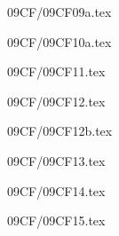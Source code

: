 \documentclass[9pt, xcolor={svgnames, x11names},professionalfonts]{beamer}
\def\scale{1}
\begin{document}

\begin{frame}{09CF/09CF09a.tex}
	
\end{frame}


\begin{frame}{09CF/09CF10a.tex}
	
\end{frame}


\begin{frame}{09CF/09CF11.tex}
	
\end{frame}


\begin{frame}{09CF/09CF12.tex}
	
\end{frame}


\begin{frame}{09CF/09CF12b.tex}
	
\end{frame}


\begin{frame}{09CF/09CF13.tex}
	
\end{frame}


\begin{frame}{09CF/09CF14.tex}
	
\end{frame}


\begin{frame}{09CF/09CF15.tex}
	
\end{frame}
\end{document}
